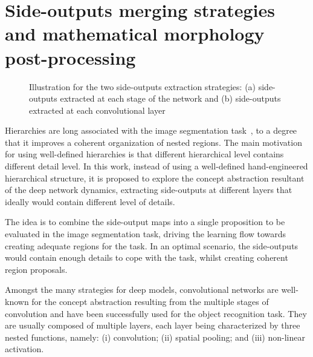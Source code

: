 \section{Side-outputs merging strategies and mathematical morphology post-processing}
\label{sec:method}

\begin{figure*}[!t]
\centering
{}
\hfil
{}
\caption{Illustration for the two side-outputs extraction strategies:  (a) side-outputs extracted at each stage of the network and (b) side-outputs extracted at each convolutional layer}
\label{fig:extraction}
\end{figure*}

Hierarchies are long associated with the image segmentation task~\cite{jones97,cardelino06,najman12,xu16,cousty18}, to a degree that it improves a coherent organization of nested regions. The main motivation for using well-defined hierarchies is that different hierarchical level contains different detail level. In this work, instead of using a well-defined hand-engineered hierarchical structure, it is proposed to explore the concept abstraction resultant of the deep network dynamics, extracting side-outputs at different layers that ideally would contain different level of details. 


The idea is to combine the side-output maps into a single proposition to be evaluated in the image segmentation task, driving the learning flow towards creating adequate regions for the task. In an optimal scenario, the side-outputs would contain enough details to cope with the task, whilst creating coherent region proposals. 

Amongst the many strategies for deep models, convolutional networks are well-known for the concept abstraction resulting from the multiple stages of convolution and have been successfully used for the object recognition task. They are usually composed of multiple layers, each layer being characterized by three nested functions, namely: (i) convolution; (ii) spatial pooling; and (iii) non-linear activation. 

